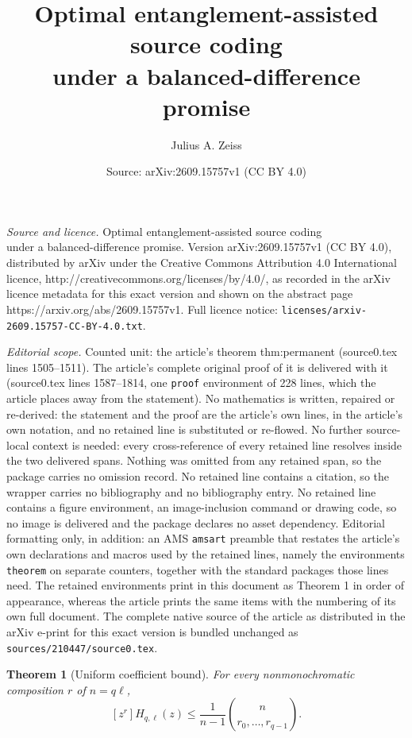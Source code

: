 \documentclass[10pt,a4paper]{amsart}
\title{Optimal entanglement-assisted source coding\\ under a balanced-difference promise}
\author{Julius A. Zeiss}
\date{Source: arXiv:2609.15757v1 (CC BY 4.0)}
\newtheorem{theorem}{Theorem}
\newcommand{\mult}[2]{\binom{#1}{#2}}
\begin{document}
\maketitle

\noindent\emph{Source and licence.} Optimal entanglement-assisted source coding\\ under a balanced-difference promise. Version arXiv:2609.15757v1 (CC BY 4.0), distributed by arXiv under the Creative Commons Attribution 4.0 International licence, http://creativecommons.org/licenses/by/4.0/, as recorded in the arXiv licence metadata for this exact version and shown on the abstract page https://arxiv.org/abs/2609.15757v1. Full licence notice: \texttt{licenses/arxiv-2609.15757-CC-BY-4.0.txt}.\par\smallskip

\noindent\textit{Editorial scope.} Counted unit: the article's theorem thm:permanent (source0.tex lines 1505--1511). The article's complete original proof of it is delivered with it (source0.tex lines 1587--1814, one \texttt{proof} environment of 228 lines, which the article places away from the statement). No mathematics is written, repaired or re-derived: the statement and the proof are the article's own lines, in the article's own notation, and no retained line is substituted or re-flowed.  No further source-local context is needed: every cross-reference of every retained line resolves inside the two delivered spans.  Nothing was omitted from any retained span, so the package carries no omission record.  No retained line contains a citation, so the wrapper carries no bibliography and no bibliography entry.  No retained line contains a figure environment, an image-inclusion command or drawing code, so no image is delivered and the package declares no asset dependency.  Editorial formatting only, in addition: an AMS \texttt{amsart} preamble that restates the article's own declarations and macros used by the retained lines, namely the environments \texttt{theorem} on separate counters, together with the standard packages those lines need.  The retained environments print in this document as Theorem 1 in order of appearance, whereas the article prints the same items with the numbering of its own full document.  The complete native source of the article as distributed in the arXiv e-print for this exact version is bundled unchanged as \texttt{sources/210447/source0.tex}.
\begin{theorem}[Uniform coefficient bound]\label{thm:permanent}
For every nonmonochromatic composition \(r\) of \(n=q\ell\),
\begin{equation}\label{eq:permanent}
 [z^r]H_{q,\ell}(z)\leq
 \frac{1}{n-1}\mult n{r_0,\ldots,r_{q-1}}.
\end{equation}
\end{theorem}
\end{document}

